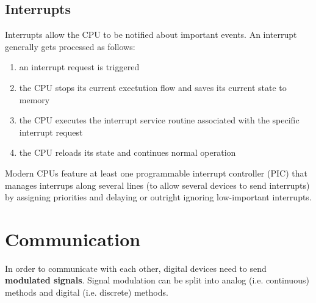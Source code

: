 \documentclass{report}
\newcommand{\tbf}{\textbf}
\begin{document}
\subsection{Interrupts}
Interrupts allow the CPU to be notified about important events. An interrupt generally gets processed as follows:
\begin{enumerate}
 \item an interrupt request is triggered
 \item the CPU stops its current exectution flow and saves its current state to memory
 \item the CPU executes the interrupt service routine associated with the specific interrupt request
 \item the CPU reloads its state and continues normal operation
\end{enumerate}
Modern CPUs feature at least one programmable interrupt controller (PIC) that manages interrups along several lines (to allow several devices to send interrupts) by assigning priorities and delaying or outright ignoring low-important interrupts.
%
\section{Communication}
In order to communicate with each other, digital devices need to send \tbf{modulated signals}. Signal modulation can be split into analog (i.e. continuous) methods and digital (i.e. discrete) methods.
\end{document}
